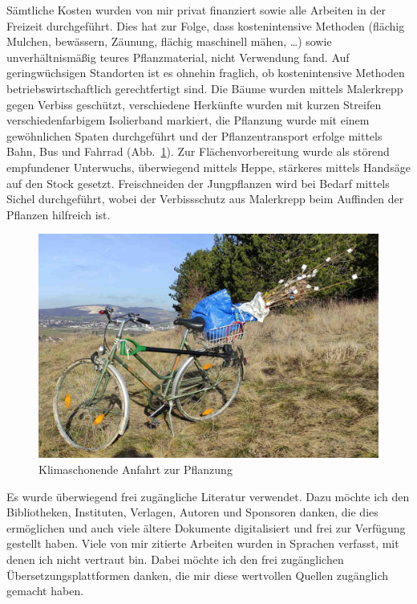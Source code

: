\documentclass[twocolumn]{scrartcl}
\begin{document}
Sämtliche Kosten wurden von mir privat finanziert sowie alle Arbeiten
in der Freizeit durchgeführt. Dies hat zur Folge, dass kostenintensive
Methoden (flächig Mulchen, bewässern, Zäunung, flächig maschinell
mähen, \dots) sowie unverhältnismäßig teures Pflanzmaterial, nicht
Verwendung fand. Auf geringwüchsigen Standorten ist es ohnehin
fraglich, ob kostenintensive Methoden betriebswirtschaftlich
gerechtfertigt sind. Die Bäume wurden mittels Malerkrepp gegen Verbiss
geschützt, verschiedene Herkünfte wurden mit kurzen Streifen
verschiedenfarbigem Isolierband markiert, die Pflanzung wurde mit
einem gewöhnlichen Spaten durchgeführt und der Pflanzentransport
erfolge mittels Bahn, Bus und Fahrrad
(Abb.~\ref{fig:fahrradPflanzung}). Zur Flächenvorbereitung wurde als
störend empfundener Unterwuchs, überwiegend mittels Heppe, stärkeres
mittels Handsäge auf den Stock gesetzt. Freischneiden der Jungpflanzen
wird bei Bedarf mittels Sichel durchgeführt, wobei der Verbissschutz
aus Malerkrepp beim Auffinden der Pflanzen hilfreich ist.

\begin{figure}[htbp]
  \centering
  \includegraphics[width=.9\linewidth]{./bild/fahrradPflanzung}
  \caption{Klimaschonende Anfahrt zur Pflanzung}
  \label{fig:fahrradPflanzung}
\end{figure}

Es wurde überwiegend frei zugängliche Literatur verwendet.
Dazu möchte ich den Bibliotheken, Instituten, Verlagen, Autoren und Sponsoren danken, die dies ermöglichen und auch viele ältere Dokumente digitalisiert und frei zur Verfügung gestellt haben.
Viele von mir zitierte Arbeiten wurden in Sprachen verfasst, mit denen ich nicht vertraut bin.
Dabei möchte ich den frei zugänglichen Übersetzungsplattformen danken, die mir diese wertvollen Quellen zugänglich gemacht haben.





\end{document}
